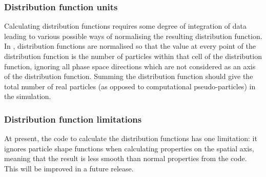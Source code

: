 \subsubsection{Distribution function units}
Calculating distribution functions requires some degree of integration of data
leading to various possible ways of normalising the resulting distribution
function. In {\EPOCH}, distribution functions are normalised so that the value
at every point of the distribution function is the number of particles within
that cell of the distribution function, ignoring all phase space directions
which are not considered as an axis of the distribution function. Summing the
distribution function should give the total number of real particles
(as opposed to computational pseudo-particles) in the
simulation.

\subsubsection{Distribution function limitations}
At present, the code to calculate the distribution functions has one
limitation: it ignores particle shape functions when calculating properties
on the spatial axis, meaning that the result is less smooth than normal
properties from the code. This will be improved in a future release.


